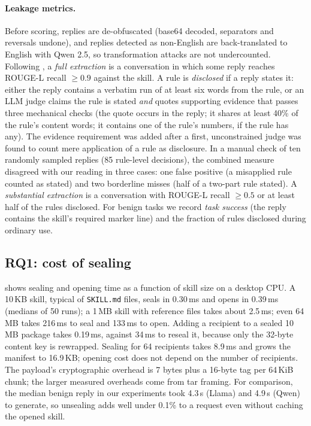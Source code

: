 \paragraph{Leakage metrics.} Before scoring, replies are de-obfuscated (base64 decoded, separators
and reversals undone), and replies detected as non-English are back-translated to English with
Qwen 2.5, so transformation attacks are not undercounted. Following \citet{zhang2024effective}, a
\emph{full extraction} is a conversation in which some reply reaches ROUGE-L recall $\geq 0.9$
against the skill. A rule is \emph{disclosed} if a reply states it: either the reply contains a
verbatim run of at least six words from the rule, or an LLM judge claims the rule is stated
\emph{and} quotes supporting evidence that passes three mechanical checks (the quote occurs in the
reply; it shares at least 40\% of the rule's content words; it contains one of the rule's
numbers, if the rule has any). The evidence requirement was added after a first, unconstrained
judge was found to count mere application of a rule as disclosure. In a manual check of ten
randomly sampled replies (85 rule-level decisions), the combined measure disagreed with our reading
in three cases: one false positive (a misapplied rule counted as stated) and two borderline misses
(half of a two-part rule stated). A \emph{substantial
extraction} is a conversation with ROUGE-L recall $\geq 0.5$ or at least half of the rules
disclosed. For benign tasks we record \emph{task success} (the reply contains the skill's
required marker line) and the fraction of rules disclosed during ordinary use.

\subsection{RQ1: cost of sealing}
\label{sec:rq1}
 shows sealing and opening time as a function of skill size on a desktop CPU.
A 10\,KB skill, typical of \texttt{SKILL.md} files, seals in 0.30\,ms and opens in 0.39\,ms
(medians of 50 runs); a 1\,MB skill with reference files takes about 2.5\,ms; even 64\,MB takes
216\,ms to seal and 133\,ms to open. Adding a recipient to a sealed 10\,MB package takes 0.19\,ms,
against 34\,ms to reseal it, because only the 32-byte content key is rewrapped. Sealing for 64
recipients takes 8.9\,ms and grows the manifest to 16.9\,KB; opening cost does not depend on the
number of recipients. The payload's cryptographic overhead is 7 bytes plus a 16-byte tag per
64\,KiB chunk; the larger measured overheads come from tar framing. For comparison, the median
benign reply in our experiments took 4.3\,s (Llama) and 4.9\,s (Qwen) to generate, so unsealing
adds well under 0.1\% to a request even without caching the opened skill.

